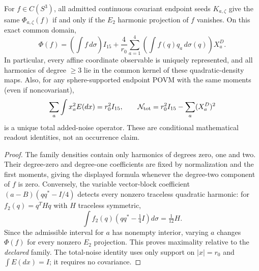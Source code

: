 \documentclass[11pt,a4paper]{article}
\begin{document}
\begin{corollary}
\label{p2f:cor:v260-common-harmonic-readout}
For \(f\in C(S^3)\), all admitted continuous covariant endpoint seeds
\(K_{a,\zeta}\) give the same \(\Phi_{a,\zeta}(f)\) if and only if the
\(E_2\) harmonic projection of \(f\) vanishes. On this exact common domain,
\[
 \Phi(f)=\left(\int f\,d\sigma\right)I_{15}
 +\frac4{r_0}\sum_{a=1}^4
   \left(\int f(q)q_a\,d\sigma(q)\right)X_a^D.
\]
In particular, every affine coordinate observable is uniquely represented,
and all harmonics of degree \(\ge3\) lie in the common kernel of these
quadratic-density maps. Also, for any sphere-supported endpoint POVM
with the same moments (even if noncovariant),
\[
 \sum_a\int x_a^2E(dx)=r_0^2I_{15},\qquad
 \mathcal N_{\rm tot}=r_0^2I_{15}-\sum_a(X_a^D)^2
\]
is a unique total added-noise operator. These are conditional
mathematical readout identities, not an occurrence claim.
\end{corollary}
\begin{proof}
The family densities contain only harmonics of degrees zero, one and
two. Their degree-zero and degree-one coefficients are fixed by
normalization and the first moments, giving the displayed formula
whenever the degree-two component of \(f\) is zero.
Conversely, the variable vector-block coefficient
\((a-B)(qq^*-I/4)\) detects every nonzero traceless quadratic harmonic:
for \(f_2(q)=q^THq\) with \(H\) traceless symmetric,
\[
 \int f_2(q)\left(qq^*-\tfrac14I\right)d\sigma=\tfrac1{12}H.
\]
Since the admissible interval for \(a\) has nonempty interior, varying
\(a\) changes \(\Phi(f)\) for every nonzero \(E_2\) projection.
This proves maximality relative to the \emph{declared} family.
The total-noise identity uses only support on \(|x|=r_0\) and
\(\int E(dx)=I\); it requires no covariance.
\end{proof}
\end{document}
